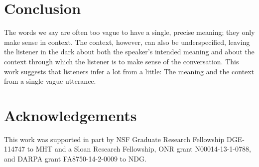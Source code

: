 \documentclass[doc]{apa6}
\begin{document}
%
%
%


\section{Conclusion}

The words we say are often too vague to have a single, precise meaning; they only make sense in context.
The context, however, can also be
underspecified, leaving the listener in the dark about both the
speaker's intended meaning and about the context through which the
listener is to make sense of the conversation. This work suggests that listeners infer a lot from a little:
The meaning and the context from a single vague utterance.


\section{Acknowledgements}

This work was supported in part by NSF Graduate Research Fellowship
DGE-114747 to MHT and a
Sloan Research Fellowship, ONR grant N00014-13-1-0788, and DARPA grant
FA8750-14-2-0009 to NDG.
\end{document}
